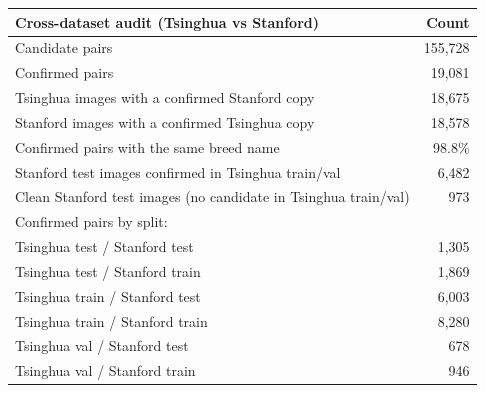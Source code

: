 \begin{tabular}{lr}
\toprule
Cross-dataset audit (Tsinghua vs Stanford) & Count \\
\midrule
Candidate pairs & 155,728 \\
Confirmed pairs & 19,081 \\
Tsinghua images with a confirmed Stanford copy & 18,675 \\
Stanford images with a confirmed Tsinghua copy & 18,578 \\
Confirmed pairs with the same breed name & 98.8\% \\
Stanford test images confirmed in Tsinghua train/val & 6,482 \\
Clean Stanford test images (no candidate in Tsinghua train/val) & 973 \\
Confirmed pairs by split: &  \\
\quad Tsinghua test / Stanford test & 1,305 \\
\quad Tsinghua test / Stanford train & 1,869 \\
\quad Tsinghua train / Stanford test & 6,003 \\
\quad Tsinghua train / Stanford train & 8,280 \\
\quad Tsinghua val / Stanford test & 678 \\
\quad Tsinghua val / Stanford train & 946 \\
\bottomrule
\end{tabular}
